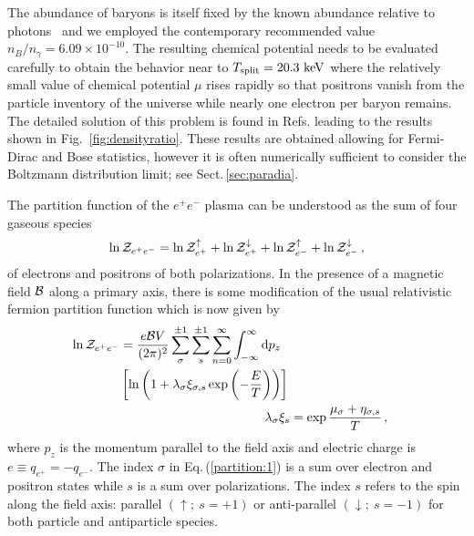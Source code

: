 \documentclass[aps,prd,floatfix,reprint]{revtex4-2}
\newcommand*{\keV}{\text{ keV}}
\newcommand{\req}[1]{Eq.\,(\ref{#1})}
\newcommand{\rf}[1]{Fig.~{\ref{#1}}}
\newcommand{\rsec}[1]{Sect.\,{\ref{#1}}}
\begin{document}
The abundance of baryons is itself fixed by the known abundance relative to photons~\cite{ParticleDataGroup:2022pth} and we employed the contemporary recommended value $n_B/n_\gamma=6.09\times 10^{-10}$. The resulting chemical potential needs to be evaluated carefully to obtain the behavior near to $T_{\rm split}=20.3\keV$ where the relatively small value of chemical potential $\mu$ rises rapidly so that positrons vanish from the particle inventory of the universe while nearly one electron per baryon remains. The detailed solution of this problem is found in Refs.\;\cite{Fromerth:2012fe,Rafelski:2023emw} leading to the results shown in \rf{fig:densityratio}. These results are obtained allowing for Fermi-Dirac and Bose statistics, however it is often numerically sufficient to consider the Boltzmann distribution limit; see \rsec{sec:paradia}.

The partition function of the $e^{+}e^{-}$ plasma can be understood as the sum of four gaseous species
\begin{align}
    \label{partition:0}    
    \ln{\cal Z}_{e^{+}e^{-}}=\ln{\cal Z}_{e^{+}}^{\uparrow}+\ln{\cal Z}_{e^{+}}^{\downarrow}+\ln{\cal Z}_{e^{-}}^{\uparrow}+\ln{\cal Z}_{e^{-}}^{\downarrow}\,,
\end{align}
of electrons and positrons of both polarizations. In the presence of a magnetic field ${\cal B}$ along a primary axis, there is some modification of the usual relativistic fermion partition function which is now given by
\begin{align}
    \begin{split}
         \label{partition:1}
         \ln{\cal Z}_{e^{+}e^{-}}&=\frac{e{\cal B}V}{(2\pi)^{2}}\sum_{\sigma}^{\pm1}\sum_{s}^{\pm1}\sum_{n=0}^{\infty}\int_{-\infty}^{\infty}{\rm d}p_{z}\\
         &\left[\ln\left(1+\lambda_{\sigma}\xi_{\sigma,s}\exp\left(-\frac{E}{T}\right)\right)\right]\,        
    \end{split}\\
    \label{partition:2}    
    \lambda_{\sigma}\xi_{s} &= \exp{\frac{\mu_{\sigma}+\eta_{\sigma,s}}{T}}\,,
\end{align}
where $p_{z}$ is the momentum parallel to the field axis and electric charge is $e\equiv q_{e^{+}}=-q_{e^{-}}$. The index $\sigma$ in \req{partition:1} is a sum over electron and positron states while $s$ is a sum over polarizations. The index $s$ refers to the spin along the field axis: parallel $(\uparrow;\ s=+1)$ or anti-parallel $(\downarrow;\ s=-1)$ for both particle and antiparticle species.
\end{document}
